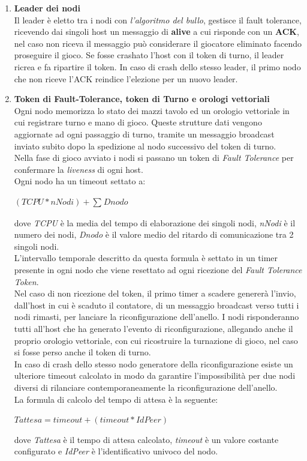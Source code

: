 \documentclass[10pt,a4paper]{article}
\begin{document}
\begin{enumerate}
\item \textbf{Leader dei nodi}\\ Il leader è eletto tra i nodi con \textit{l'algoritmo del bullo}, gestisce il fault tolerance, ricevendo dai singoli host un messaggio di \textbf{alive} a cui risponde con un \textbf{ACK}, nel caso non riceva il messaggio può considerare il giocatore eliminato facendo proseguire il gioco. Se fosse crashato l'host con il token di turno, il leader ricrea e fa ripartire il token. In caso di crash dello stesso leader, il primo nodo che non riceve l'ACK reindice l'elezione per un nuovo leader. 

\item \textbf{Token di Fault-Tolerance, token di Turno e orologi vettoriali}\\ Ogni nodo memorizza lo stato dei mazzi tavolo ed un orologio vettoriale in cui registrare turno e mano di gioco. Queste strutture dati vengono aggiornate ad ogni passaggio di turno, tramite un messaggio broadcast inviato subito dopo la spedizione al nodo successivo del token di turno.\\ Nella fase di gioco avviato i nodi si passano un token di \textit{Fault Tolerance} per confermare la \textit{liveness} di ogni host. \\ Ogni nodo ha un timeout settato a: \\\begin{center}$(TCPU*nNodi)+\sum_{}Dnodo$\end{center} dove \textit{TCPU} è la media del tempo di elaborazione dei singoli nodi, \textit{nNodi} è il numero dei nodi, \textit{Dnodo} è il valore medio del ritardo di comunicazione tra 2 singoli nodi.\\L'intervallo temporale descritto da questa formula è settato in un timer presente in ogni nodo che viene resettato ad ogni ricezione del \textit{Fault Tolerance Token}.\\ Nel caso di non ricezione del token, il primo timer a scadere genererà l'invio, dall'host in cui è scaduto il contatore, di un messaggio broadcast verso tutti i nodi rimasti, per lanciare la riconfigurazione dell'anello. I nodi risponderanno tutti all'host che ha generato l'evento di riconfigurazione, allegando anche il proprio orologio vettoriale, con cui ricostruire la turnazione di gioco, nel caso si fosse perso anche il token di turno. \\ In caso di crash dello stesso nodo generatore della riconfigurazione esiste un ulteriore timeout calcolato in modo da garantire l'impossibilità per due nodi diversi di rilanciare contemporaneamente la riconfigurazione dell'anello.\\ La formula di calcolo del tempo di attesa è la seguente:\begin{center}$Tattesa = timeout +(timeout * IdPeer)$\end{center}dove \textit{Tattesa} è il tempo di attesa calcolato, \textit{timeout} è un valore costante configurato e \textit{IdPeer} è l'identificativo univoco del nodo.\end{enumerate}
\end{document}

